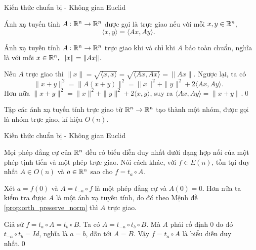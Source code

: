 \begin{frame}{Kiến thức chuẩn bị - Không gian Euclid}
    \begin{define}
        Ánh xạ tuyến tính $A: \mathbb R^n \rightarrow \mathbb R^n$ được gọi là \alert{trực giao} nếu với mỗi $x, y \in \mathbb R^n$,
        $$
            \langle x,y \rangle = \langle Ax, Ay \rangle.
        $$
    \end{define}
    \begin{proposition}\label{prop:orth_preserve_norm}
        Ánh xạ tuyến tính $A: \mathbb R^n \rightarrow \mathbb R^n$ trực giao khi và chỉ khi $A$ bảo toàn chuẩn, nghĩa là với mỗi $x \in \R^n,\ \|x\| = \|Ax\|$.
    \end{proposition}
    \startproof Nếu $A$ trực giao thì $\|x\| = \sqrt{\langle x,x \rangle} = \sqrt{\langle Ax,Ax \rangle} = \|Ax\|$. Ngược lại, ta có
    $$
        \|x+y\|^2 = \|A(x+y)\|^2 = \|x\|^2 + \|y\|^2 + 2 \langle Ax,Ay \rangle.
    $$
    Hơn nữa $\|x+y\|^2 = \|x\|^2 + \|y\|^2 + 2 \langle x,y \rangle$, suy ra $ \langle Ax,Ay \rangle = \|x+y\|$.\qed
    \begin{proposition}
        Tập các ánh xạ tuyến tính trực giao từ $\mathbb R^n \rightarrow \mathbb R^n$ tạo thành một nhóm, được gọi là \alert{nhóm trực giao}, kí hiệu $O(n)$.
    \end{proposition}
\end{frame}

\begin{frame}{Kiến thức chuẩn bị - Không gian Euclid}
    \begin{proposition}
        Mọi phép đẳng cự của $\mathbb R^n$ đều có biểu diễn duy nhất dưới dạng hợp nối của một phép tịnh tiến và một phép trực giao. Nói cách khác, với $f \in E(n)$, tồn tại duy nhất $A \in O(n)$ và $a \in \mathbb R^n$ sao cho $f = t_a \circ A$.
    \end{proposition}
    \startproof Xét $a = f(0)$ và $A = t_{-a} \circ f$ là một phép đẳng cự và $A(0) = 0$. Hơn nữa ta kiểm tra được $A$ là một ánh xạ tuyến tính, do đó theo Mệnh đề \ref{prop:orth_preserve_norm} thì $A$ trực giao.

    Giả sử $f = t_a \circ A = t_b \circ B$. Ta có $A = t_{-a} \circ t_b \circ B$. Mà $A$ phải cố định $0$ do đó $t_{-a} \circ t_b = Id$, nghĩa là $a = b$, dẫn tới $A = B$. Vậy $f = t_a \circ A$ là biểu diễn duy nhất.\qed
\end{frame}

